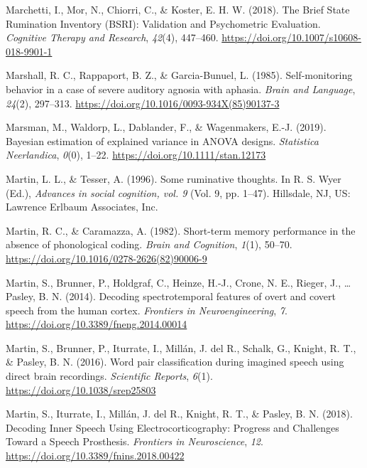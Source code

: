 \documentclass[a4paper,12pt,twoside,onecolumn,openright,final,oldfontcommands]{memoir}
\begin{document}
\leavevmode\hypertarget{ref-marchetti_brief_2018}{}%
Marchetti, I., Mor, N., Chiorri, C., \& Koster, E. H. W. (2018). The Brief State Rumination Inventory (BSRI): Validation and Psychometric Evaluation. \emph{Cognitive Therapy and Research}, \emph{42}(4), 447--460. \url{https://doi.org/10.1007/s10608-018-9901-1}

\leavevmode\hypertarget{ref-marshall_self-monitoring_1985}{}%
Marshall, R. C., Rappaport, B. Z., \& Garcia-Bunuel, L. (1985). Self-monitoring behavior in a case of severe auditory agnosia with aphasia. \emph{Brain and Language}, \emph{24}(2), 297--313. \url{https://doi.org/10.1016/0093-934X(85)90137-3}

\leavevmode\hypertarget{ref-marsman_bayesian_2019}{}%
Marsman, M., Waldorp, L., Dablander, F., \& Wagenmakers, E.-J. (2019). Bayesian estimation of explained variance in ANOVA designs. \emph{Statistica Neerlandica}, \emph{0}(0), 1--22. \url{https://doi.org/10.1111/stan.12173}

\leavevmode\hypertarget{ref-Martin}{}%
Martin, L. L., \& Tesser, A. (1996). Some ruminative thoughts. In R. S. Wyer (Ed.), \emph{Advances in social cognition, vol. 9} (Vol. 9, pp. 1--47). Hillsdale, NJ, US: Lawrence Erlbaum Associates, Inc.

\leavevmode\hypertarget{ref-martin_short-term_1982}{}%
Martin, R. C., \& Caramazza, A. (1982). Short-term memory performance in the absence of phonological coding. \emph{Brain and Cognition}, \emph{1}(1), 50--70. \url{https://doi.org/10.1016/0278-2626(82)90006-9}

\leavevmode\hypertarget{ref-martin_decoding_2014}{}%
Martin, S., Brunner, P., Holdgraf, C., Heinze, H.-J., Crone, N. E., Rieger, J., \ldots{} Pasley, B. N. (2014). Decoding spectrotemporal features of overt and covert speech from the human cortex. \emph{Frontiers in Neuroengineering}, \emph{7}. \url{https://doi.org/10.3389/fneng.2014.00014}

\leavevmode\hypertarget{ref-martin_word_2016}{}%
Martin, S., Brunner, P., Iturrate, I., Millán, J. del R., Schalk, G., Knight, R. T., \& Pasley, B. N. (2016). Word pair classification during imagined speech using direct brain recordings. \emph{Scientific Reports}, \emph{6}(1). \url{https://doi.org/10.1038/srep25803}

\leavevmode\hypertarget{ref-martin_decoding_2018}{}%
Martin, S., Iturrate, I., Millán, J. del R., Knight, R. T., \& Pasley, B. N. (2018). Decoding Inner Speech Using Electrocorticography: Progress and Challenges Toward a Speech Prosthesis. \emph{Frontiers in Neuroscience}, \emph{12}. \url{https://doi.org/10.3389/fnins.2018.00422}
\end{document}
